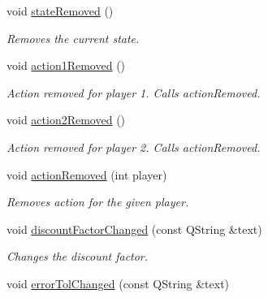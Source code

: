 \begin{DoxyCompactItemize}
\mbox{\label{classSGGameHandler_afd1cf958d916d9b1ee4a5aac70bc13ca}} 
void \hyperlink{classSGGameHandler_afd1cf958d916d9b1ee4a5aac70bc13ca}{state\+Removed} ()
\begin{DoxyCompactList}\small\item\em Removes the current state. \end{DoxyCompactList}\item 
\mbox{\label{classSGGameHandler_ab3d00af463f833fd6417a754073494cc}} 
void \hyperlink{classSGGameHandler_ab3d00af463f833fd6417a754073494cc}{action1\+Removed} ()
\begin{DoxyCompactList}\small\item\em Action removed for player 1. Calls action\+Removed. \end{DoxyCompactList}\item 
\mbox{\label{classSGGameHandler_ac55ea0d4296a14684c2735dd1c69c22e}} 
void \hyperlink{classSGGameHandler_ac55ea0d4296a14684c2735dd1c69c22e}{action2\+Removed} ()
\begin{DoxyCompactList}\small\item\em Action removed for player 2. Calls action\+Removed. \end{DoxyCompactList}\item 
void \hyperlink{classSGGameHandler_aed866fdb5315e2a593f659206eabbef3}{action\+Removed} (int player)
\begin{DoxyCompactList}\small\item\em Removes action for the given player. \end{DoxyCompactList}\item 
\mbox{\label{classSGGameHandler_abfc41eef3937a69a3fa9d355f8f8afbb}} 
void \hyperlink{classSGGameHandler_abfc41eef3937a69a3fa9d355f8f8afbb}{discount\+Factor\+Changed} (const Q\+String \&text)
\begin{DoxyCompactList}\small\item\em Changes the discount factor. \end{DoxyCompactList}\item 
\mbox{\label{classSGGameHandler_aa556fc6fe75492c7e3eac05ccd54fe29}} 
void \hyperlink{classSGGameHandler_aa556fc6fe75492c7e3eac05ccd54fe29}{error\+Tol\+Changed} (const Q\+String \&text)

\end{DoxyCompactItemize}
